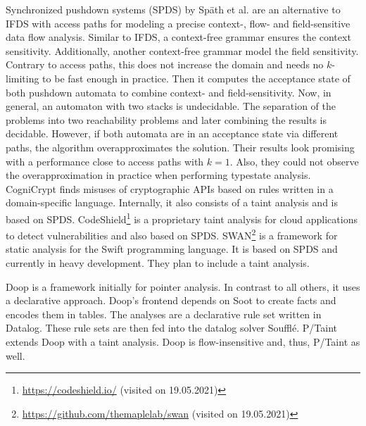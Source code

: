 \documentclass[../draft.tex]{subfiles}
\begin{document}
    Synchronized pushdown systems (SPDS) by Späth et al.\cite{Spaeth2019} are an alternative to IFDS with access paths for modeling a precise context-, flow- and field-sensitive data flow analysis.
    Similar to IFDS, a context-free grammar ensures the context sensitivity.
    Additionally, another context-free grammar model the field sensitivity.
    Contrary to access paths, this does not increase the domain and needs no $k$-limiting to be fast enough in practice.
    Then it computes the acceptance state of both pushdown automata to combine context- and field-sensitivity.
    Now, in general, an automaton with two stacks is undecidable.
    The separation of the problems into two reachability problems and later combining the results is decidable.
    However, if both automata are in an acceptance state via different paths, the algorithm overapproximates the solution.
    Their results look promising with a performance close to access paths with $k=1$.
    Also, they could not observe the overapproximation in practice when performing typestate analysis.\\
    CogniCrypt\cite{Krueger2017} finds misuses of cryptographic APIs based on rules written in a domain-specific language.
    Internally, it also consists of a taint analysis and is based on SPDS.
    CodeShield\footnote{\url{https://codeshield.io/} (visited on 19.05.2021)} is a proprietary taint analysis for cloud applications to detect vulnerabilities and also based on SPDS.
    SWAN\footnote{\url{https://github.com/themaplelab/swan} (visited on 19.05.2021)} is a framework for static analysis for the Swift programming language. It is based on SPDS and currently in heavy development\footnotemark{}.
    They plan to include a taint analysis.

    Doop\cite{Bravenboer2009} is a framework initially for pointer analysis.
    In contrast to all others, it uses a declarative approach.
    Doop's frontend depends on Soot to create facts and encodes them in tables.
    The analyses are a declarative rule set written in Datalog.
    These rule sets are then fed into the datalog solver Soufflé\cite{Scholz2016}.
    P/Taint\cite{Grech2017} extends Doop with a taint analysis.
    Doop is flow-insensitive and, thus, P/Taint as well.
\end{document}
